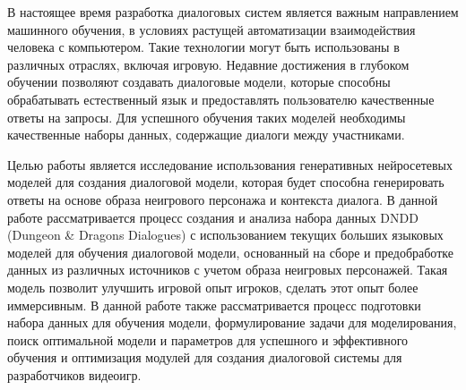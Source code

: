 В настоящее время разработка диалоговых систем является важным направлением машинного обучения, в условиях растущей автоматизации взаимодействия человека с компьютером. Такие технологии могут быть использованы в различных отраслях, включая игровую. Недавние достижения в глубоком обучении позволяют создавать диалоговые модели, которые способны обрабатывать естественный язык и предоставлять пользователю качественные ответы на запросы. Для успешного обучения таких моделей необходимы качественные наборы данных, содержащие диалоги между участниками.

Целью работы является исследование использования генеративных нейросетевых моделей для создания диалоговой модели, которая будет способна генерировать ответы на основе образа неигрового персонажа и контекста диалога. В данной работе рассматривается процесс создания и анализа набора данных DNDD (Dungeon \& Dragons Dialogues) с использованием текущих больших языковых моделей для обучения диалоговой модели, основанный на сборе и предобработке данных из различных источников с учетом образа неигровых персонажей. Такая модель позволит улучшить игровой опыт игроков, сделать этот опыт более иммерсивным. В данной работе также рассматривается процесс подготовки набора данных для обучения модели, формулирование задачи для моделирования, поиск оптимальной модели и параметров для успешного и эффективного обучения и оптимизация модулей для создания диалоговой системы для разработчиков видеоигр.